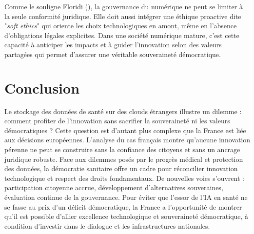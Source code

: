 \documentclass[10pt,a4paper]{article}
\begin{document}
Comme le souligne Floridi (\citeyear{floridi2018soft}), la gouvernance du numérique ne peut se limiter à la seule conformité juridique. Elle doit aussi intégrer une éthique proactive dite "\textit{soft ethics}" qui oriente les choix technologiques en amont, même en l’absence d’obligations légales explicites. Dans une société numérique mature, c’est cette capacité à anticiper les impacts et à guider l’innovation selon des valeurs partagées qui permet d’assurer une véritable souveraineté démocratique.

\section*{Conclusion}

Le stockage des données de santé sur des clouds étrangers illustre un dilemme : comment profiter de l’innovation sans sacrifier la souveraineté ni les valeurs démocratiques ? Cette question est d’autant plus complexe que la France est liée aux décisions européennes. L'analyse du cas français montre qu'aucune innovation pérenne ne peut se construire sans la confiance des citoyens et sans un ancrage juridique robuste. Face aux dilemmes posés par le progrès médical et protection des données, la démocratie sanitaire \parencite{lefeuvre2018democratie} offre un cadre pour réconcilier innovation technologique et respect des droits fondamentaux.
De nouvelles voies s'ouvrent : participation citoyenne accrue, développement d'alternatives souveraines, évaluation continue de la gouvernance. Pour éviter que l'essor de l'IA en santé ne se fasse au prix d'un déficit démocratique, la France a l'opportunité de montrer qu'il est possible d'allier excellence technologique et souveraineté démocratique, à condition d'investir dans le dialogue et les infrastructures nationales.

\newpage{}

\printbibliography[
heading=bibintoc,
title={Références}
]
\end{document}
